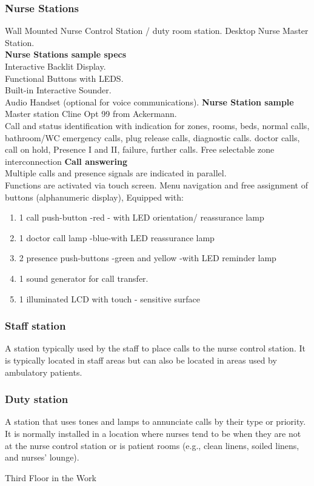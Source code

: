 \documentclass[12pt,fleqn]{book} %
\begin{document}
\subsubsection{Nurse Stations}
Wall Mounted Nurse Control Station / duty room station. Desktop Nurse Master Station.
\\ \textbf{Nurse Stations sample specs}
\\ Interactive Backlit Display.
\\ Functional Buttons with LEDS.
\\ Built-in Interactive Sounder.
\\ Audio Handset (optional for voice communications).
\textbf{Nurse Station sample}
\\ Master station Cline Opt 99 from Ackermann.
\\ Call and status identification with indication for zones, rooms, beds, normal calls, bathroom/WC emergency calls, plug release calls, diagnostic calls. doctor calls, call on hold, Presence I and II, failure, further calls. Free selectable zone interconnection
\textbf{Call answering}
\\ Multiple calls and presence signals are indicated in parallel.
\\ Functions are activated via touch screen. Menu navigation and free assignment of buttons (alphanumeric display), Equipped with:
\begin{enumerate}
    \item 1 call push-button -red - with LED orientation/ reassurance lamp
    \item 1 doctor call lamp -blue-with LED reassurance lamp
    \item 2 presence push-buttons -green and yellow -with LED reminder lamp
    \item 1 sound generator for call transfer.
    \item 1 illuminated LCD with touch - sensitive surface
\end{enumerate}
\subsubsection{Staff station}
A station typically used by the staff to place calls to the nurse control station. It is typically located in staff areas but can also be located in areas used by ambulatory patients.
\subsubsection{Duty station}
A station that uses tones and lamps to annunciate calls by their type or priority. 
\\ It is normally installed in a location where nurses tend to be when they are not at the nurse control station or is patient rooms (e.g., clean linens, soiled linens, and nurses' lounge).
\begin{example}
Third Floor in the Work
\end{example}
\end{document}
